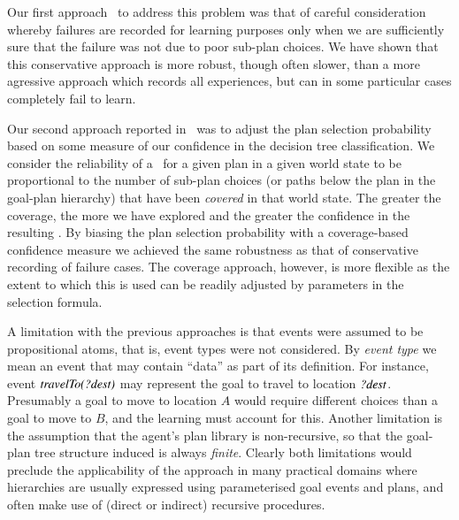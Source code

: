 Our first approach~\cite{Airiau:IJAT:09} to address this problem was that 
of careful consideration whereby failures are recorded for learning purposes 
only when we are sufficiently sure that the failure was not due to poor
sub-plan choices. 
We have shown that this conservative approach is more robust, 
though often slower, than a more agressive
approach which records all experiences, but can in some particular cases
completely fail to learn.

Our second approach reported in~\cite{Singh:AAMAS10} was to
adjust the plan selection probability based on some measure of 
our confidence in the decision tree classification.
%
We consider the reliability of a \dt\ for a given plan in a given 
world state to be proportional to the number of sub-plan choices (or paths
below the plan in the goal-plan hierarchy) that have been
\textit{covered} in that  
world state. The greater the coverage, the more we have explored and the
greater the confidence in the resulting \dt.
%
By biasing the plan selection probability with a coverage-based confidence
measure we achieved the same robustness as that of conservative recording of 
failure cases. The coverage approach, however, is more 
flexible as the extent to which this is used can be
readily adjusted by parameters in the selection formula. 


A limitation with the previous approaches is that 
events were assumed to be propositional atoms, that is, event
types were not considered. By \emph{event type} we mean an event that may
contain ``data'' as part of its definition. For instance, event
${\mbox{\textit{travelTo(?dest)}}}$ may represent the goal to travel to location
${\mbox{\textit{?dest}}}$. Presumably a goal to move to location $A$ would 
require different choices than a goal to move to $B$, and the learning
must account for this.
Another limitation is the assumption that the agent's plan library is
non-recursive, so that the goal-plan tree structure induced is always
\emph{finite}.
Clearly both limitations would preclude the applicability of the approach in
many practical domains where hierarchies are usually expressed
using parameterised goal events and plans, and often make
use of (direct or indirect) recursive procedures.


